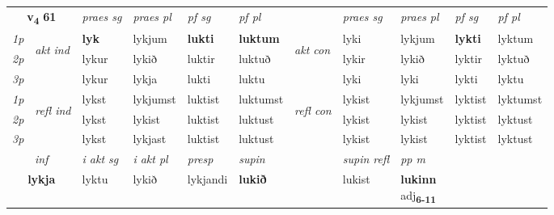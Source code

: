 \noindent
\begin{tabular}{lllllllllll} \toprule
\multicolumn{2}{c}{\textbf{v{\textsubscript{4}}} \Large{\textbf{61}}}  &  \textit{praes sg}  & \textit{praes pl}  &\textit{ pf sg} & \textit{pf pl} &  &  \textit{praes sg}  & \textit{praes pl}  & \textit{pf sg} & \textit{pf pl } \\*
	\cmidrule{3-6} \cmidrule{8-11}
 {\textit{1p}} & \multirow{3}{*}{\begin{turn}{90}\textit{akt ind}\end{turn}} & \textbf{lyk} & lykjum & \textbf{lukti} & \textbf{luktum} & \multirow{3}{*}{\begin{turn}{90}\textit{akt con}\end{turn}} &lyki & lykjum & \textbf{lykti} & lyktum\\*
 {\textit{2p}} &  &  lykur  & lykið & luktir & luktuð & & lykir & lykið & lyktir & lyktuð \\*
{\textit{3p}} &  & lykur & lykja & lukti & luktu & & lyki & lyki& lykti & lyktu \\*
\cmidrule{3-6} \cmidrule{8-11}
 {\textit{1p}} & \multirow{3}{*}{\begin{turn}{90}\textit{refl ind}\end{turn}}  & lykst & lykjumst & luktist & luktumst & \multirow{3}{*}{\begin{turn}{90}\textit{refl con}\end{turn}}  &lykist & lykjumst & lyktist & lyktumst \\*
 {\textit{2p}} &  & lykst & lykist & luktist & luktust & &lykist & lykist & lyktist & lyktust \\*
 {\textit{3p}}  & & lykst & lykjast & luktist & luktust & & lykist & lykist& lyktist & lyktust \\*
\cmidrule{3-6} \cmidrule{8-11}

   \multicolumn{2}{c}{\textit{inf}}  & \textit{i akt sg} & \textit{i akt pl}   & \textit{presp} & \textit{supin} && \textit{supin refl} & \textit{pp m} \\*
  \multicolumn{2}{c}{\textbf{lykja}} & lyktu  & lykið   & lykjandi &  \textbf{lukið} && lukist & \specialcell{\textbf{lukinn} \\ adj\textbf{\textsubscript{6-11}}} \\*
\end{tabular}


